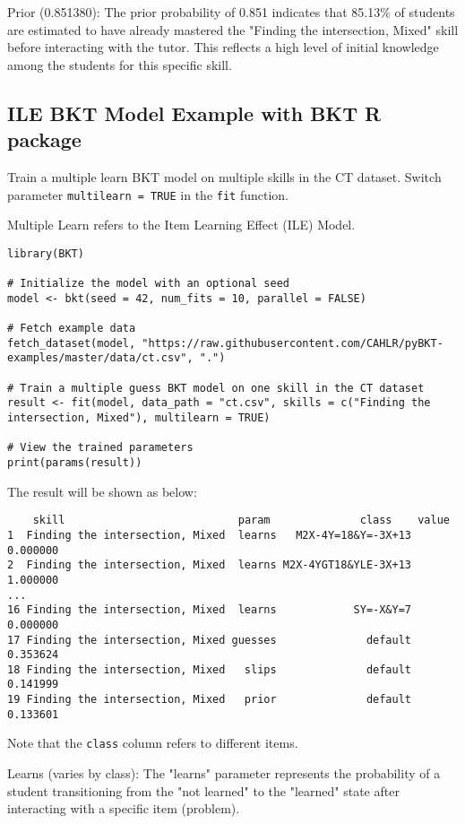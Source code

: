 \documentclass{article}
\begin{document}
Prior (0.851380): The prior probability of 0.851 indicates that 85.13\% of students are estimated to have already mastered the "Finding the intersection, Mixed" skill before interacting with the tutor. This reflects a high level of initial knowledge among the students for this specific skill.

\subsection{ILE BKT Model Example with BKT R package}

Train a multiple learn BKT model on multiple skills in the CT dataset. Switch parameter \texttt{multilearn = TRUE} in the \texttt{fit} function.

Multiple Learn refers to the Item Learning Effect (ILE) Model.

\begin{lstlisting}[caption={R code to train an ILE BKT model}]
library(BKT)

# Initialize the model with an optional seed
model <- bkt(seed = 42, num_fits = 10, parallel = FALSE)

# Fetch example data
fetch_dataset(model, "https://raw.githubusercontent.com/CAHLR/pyBKT-examples/master/data/ct.csv", ".")

# Train a multiple guess BKT model on one skill in the CT dataset
result <- fit(model, data_path = "ct.csv", skills = c("Finding the intersection, Mixed"), multilearn = TRUE)

# View the trained parameters
print(params(result))
\end{lstlisting}

The result will be shown as below:

\begin{verbatim}
    skill                           param              class    value
1  Finding the intersection, Mixed  learns   M2X-4Y=18&Y=-3X+13 0.000000
2  Finding the intersection, Mixed  learns M2X-4YGT18&YLE-3X+13 1.000000
...
16 Finding the intersection, Mixed  learns            SY=-X&Y=7 0.000000
17 Finding the intersection, Mixed guesses              default 0.353624
18 Finding the intersection, Mixed   slips              default 0.141999
19 Finding the intersection, Mixed   prior              default 0.133601
\end{verbatim}
Note that the \texttt{class} column refers to different items.

Learns (varies by class): The "learns" parameter represents the probability of a student transitioning from the "not learned" to the "learned" state after interacting with a specific item (problem).
\end{document}
